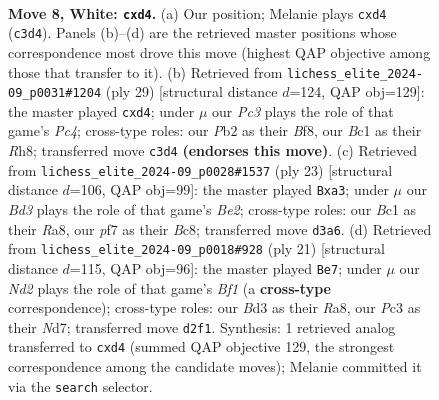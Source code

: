 \documentclass[11pt]{article}
\begin{document}
\begin{figure}[p]\centering
\begin{subfigure}{0.46\textwidth}\centering
\resizebox{\linewidth}{!}{%
\newchessgame
\chessboard[
  setfen={r1bqkb1r/pp1n1ppp/2n1p3/3pP3/3p2Q1/2PB4/PP1N1PPP/R1B1K1NR w KQkq - 0 8},
  showmover=false,
  pgfstyle=straightmove, color=movearrow, markmove={c3-d4}
]}
\caption{}
\end{subfigure}\hfill
\begin{subfigure}{0.46\textwidth}\centering
\resizebox{\linewidth}{!}{%
\newchessgame
\chessboard[
  setfen={r4bnr/5k2/4p3/p1ppPb1p/3P3q/P1N1B2P/1P2BPP1/R2QK2R b KQ - 1 15},
  showmover=false,
  pgfstyle=straightmove, color=movearrow, markmove={c5-d4}
]}
\caption{}
\end{subfigure}
\\[4pt]
\begin{subfigure}{0.46\textwidth}\centering
\resizebox{\linewidth}{!}{%
\newchessgame
\chessboard[
  setfen={r1b1k2r/1p1nbppp/1qn1p3/3pP3/p2P1N1P/P4N2/1P3PP1/1RBQKB1R b Kkq - 0 12},
  showmover=false,
  pgfstyle=straightmove, color=movearrow, markmove={e7-a3}
]}
\caption{}
\end{subfigure}\hfill
\begin{subfigure}{0.46\textwidth}\centering
\resizebox{\linewidth}{!}{%
\newchessgame
\chessboard[
  setfen={r1b1kb1r/1p1n1ppp/1qn1p3/3pP3/p2P1N2/P4N2/1P3PPP/1RBQKB1R b Kkq - 0 11},
  showmover=false,
  pgfstyle=straightmove, color=movearrow, markmove={f8-e7}
]}
\caption{}
\end{subfigure}
\caption{\textbf{Move 8, White: \texttt{cxd4}.} (a) Our position; Melanie plays \texttt{cxd4} (\texttt{c3d4}). Panels (b)--(d) are the retrieved master positions whose correspondence most drove this move (highest QAP objective among those that transfer to it). (b) Retrieved from \texttt{lichess\_elite\_2024-09\_p0031\#1204} (ply 29) [structural distance $d$=124, QAP obj=129]: the master played \texttt{cxd4}; under $\mu$ our \emph{Pc3} plays the role of that game's \emph{Pc4}; cross-type roles: our \emph{P}b2 as their \emph{B}f8, our \emph{B}c1 as their \emph{R}h8; transferred move \texttt{c3d4} \textbf{(endorses this move)}. (c) Retrieved from \texttt{lichess\_elite\_2024-09\_p0028\#1537} (ply 23) [structural distance $d$=106, QAP obj=99]: the master played \texttt{Bxa3}; under $\mu$ our \emph{Bd3} plays the role of that game's \emph{Be2}; cross-type roles: our \emph{B}c1 as their \emph{R}a8, our \emph{p}f7 as their \emph{B}c8; transferred move \texttt{d3a6}. (d) Retrieved from \texttt{lichess\_elite\_2024-09\_p0018\#928} (ply 21) [structural distance $d$=115, QAP obj=96]: the master played \texttt{Be7}; under $\mu$ our \emph{Nd2} plays the role of that game's \emph{Bf1} (a \textbf{cross-type} correspondence); cross-type roles: our \emph{B}d3 as their \emph{R}a8, our \emph{P}c3 as their \emph{N}d7; transferred move \texttt{d2f1}. Synthesis: 1 retrieved analog transferred to \texttt{cxd4} (summed QAP objective 129, the strongest correspondence among the candidate moves); Melanie committed it via the \texttt{search} selector.}
\label{fig:thought-m14}
\end{figure}
\end{document}
